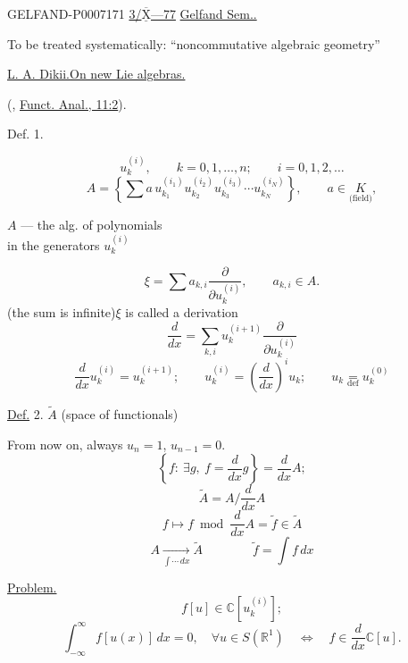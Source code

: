 \begin{GelfandAdjacentEvidence}{GELFAND-P000717}{1}
\underline{3/\(\overline{\underline{\mathrm X}}\)---77}
\qquad \underline{Gelfand Sem..}

\begin{flushright}
To be treated systematically: “noncommutative algebraic geometry”
\end{flushright}

\underline{\underline{L. A. Dikii.}}\qquad \underline{On new Lie algebras.}

(, \href{https://www.mathnet.ru/eng/faa2064}{Funct. Anal., 11:2}).

Def. 1. \quad {}

\end{GelfandAdjacentEvidence}
\par\begingroup\setlength{\parindent}{0pt}\setlength{\parskip}{.4em}\raggedright


\[
u_k^{(i)},\qquad k=0,1,\ldots,n;\qquad i=0,1,2,\ldots
\]
\[
A=\left\{\sum a\,u_{k_1}^{(i_1)}u_{k_2}^{(i_2)}u_{k_3}^{(i_3)}
\cdots u_{k_N}^{(i_N)}\right\},\qquad a\in\underset{\text{(field)}}{K},
\]
\begin{flushright}
\(A\) --- the alg. of polynomials\\
in the generators \(u_k^{(i)}\)\\
\end{flushright}
\[
\xi=\sum a_{k,i}\frac{\partial}{\partial u_k^{(i)}},\qquad a_{k,i}\in A.
\]
(the sum is infinite)\qquad \(\xi\) is called a derivation
\[
\frac{d}{dx}=\sum_{k,i}u_k^{(i+1)}\frac{\partial}{\partial u_k^{(i)}}
\]
\[
\frac{d}{dx}u_k^{(i)}=u_k^{(i+1)};\qquad
u_k^{(i)}=\left(\frac{d}{dx}\right)^i u_k;\qquad
u_k\underset{\mathrm{def}}{=}u_k^{(0)}
\]

\underline{Def.} 2. \quad {} \(\widetilde A\) (space of functionals)

From now on, always \(u_n=1\), \(u_{n-1}=0\).
\[
\left\{f:\ \exists g,\ f=\frac{d}{dx}g\right\}=\frac{d}{dx}A;
\]
\[
\widetilde A=A\big/\frac{d}{dx}A
\]
\[
f\longmapsto f\bmod\frac{d}{dx}A=\widetilde f\in\widetilde A
\]
\[
A\underset{\int\cdots\,dx}{\longrightarrow}\widetilde A
\qquad\qquad
\widetilde f=\int f\,dx
\]

\underline{Problem.}
\[
f[u]\in\mathbb C[u_k^{(i)}];
\]
\[
\int_{-\infty}^{\infty}f[u(x)]\,dx=0,\quad\forall u\in S(\mathbb R^1)
\quad\Longleftrightarrow\quad
f\in\frac{d}{dx}\mathbb C[u].
\]

